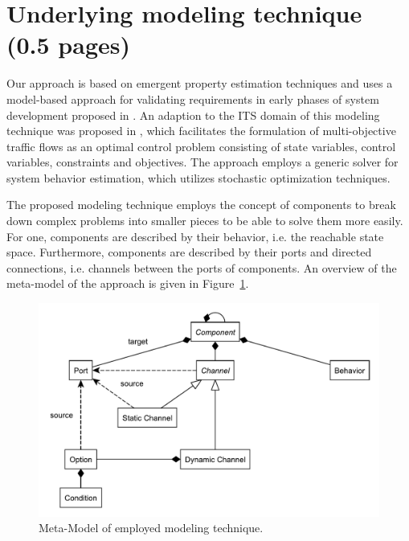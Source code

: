\section{Underlying modeling technique (0.5 pages)}
\label{section:contribution_0}

Our approach is based on emergent property estimation techniques \cite{hackenberg2012towards} and uses a model-based approach for validating requirements in early phases of system development proposed in \cite{hackenberg2014rapid}. An adaption to the ITS domain of this modeling technique was proposed in \cite{ascher2014early}, which facilitates the formulation of multi-objective traffic flows as an optimal control problem consisting of state variables, control variables, constraints and objectives. The approach employs a generic solver for system behavior estimation, which utilizes stochastic optimization techniques.

The proposed modeling technique employs the concept of components to break down complex problems into smaller pieces to be able to solve them more easily. For one, components are described by their behavior, i.e. the reachable state space. Furthermore, components are described by their ports and directed connections, i.e. channels between the ports of components. An overview of the meta-model of the approach is given in Figure~\ref{fig:meta_model}.

\begin{figure}[h]
	\centering
	\includegraphics[width=\columnwidth]{../gfx/meta_model2.pdf}
	\caption{Meta-Model of employed modeling technique.}
	\label{fig:meta_model}
\end{figure}

